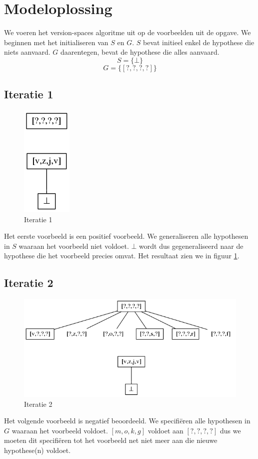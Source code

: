 \documentclass[alternative-exam.tex]{subfiles}
\begin{document}
\section{Modeloplossing}
We voeren het version-spaces algoritme uit op de voorbeelden uit de opgave. We beginnen met het initialiseren van $S$ en $G$. $S$ bevat initieel enkel de hypothese die niets aanvaard. $G$ daarentegen, bevat de hypothese die alles aanvaard.
\[
S = \{\bot\}
\]
\[
G = \{[?,?,?,?]\}
\]
\subsection{Iteratie 1}
\begin{figure}
[H]
\centering
\caption{Iteratie 1}
\label{iter_1}
\includegraphics[scale=0.5]{resources/graphs/iteration_1.png}
\end{figure}
Het eerste voorbeeld is een positief voorbeeld. We generaliseren alle hypothesen in $S$ waaraan het voorbeeld niet voldoet. $\bot$ wordt dus gegeneraliseerd naar de hypothese die het voorbeeld precies omvat. Het resultaat zien we in figuur \ref{iter_1}.

\subsection{Iteratie 2}
\begin{figure}
[H]
\centering
\caption{Iteratie 2}
\label{iter_2}
\includegraphics[scale=0.5]{resources/graphs/iteration_2.png}
\end{figure}
Het volgende voorbeeld is negatief beoordeeld. We specifi\"eren alle hypothesen in $G$ waaraan het voorbeeld voldoet. $[m,o,k,g]$ voldoet aan $[?,?,?,?]$ dus we moeten dit specifi\"eren tot het voorbeeld net niet meer aan die nieuwe hypothese(n) voldoet.
\end{document}

